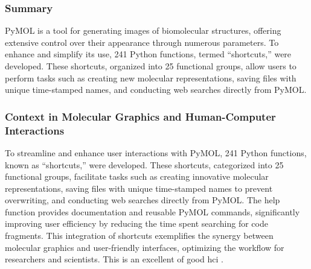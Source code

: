

\subsubsection*{Summary} 
PyMOL is a tool for generating images of biomolecular structures, offering extensive control over their appearance through numerous parameters. 
To enhance and simplify its use, 241 Python functions, termed “shortcuts,” were developed. 
These shortcuts, organized into 25 functional groups, allow users to perform tasks such as creating new molecular representations, saving files with unique time-stamped names, and conducting web searches directly from PyMOL. 

\subsubsection*{Context in Molecular Graphics and Human-Computer Interactions} 
To streamline and enhance user interactions with PyMOL, 241 Python functions, known as “shortcuts,” were developed. 
These shortcuts, categorized into 25 functional groups, facilitate tasks such as creating innovative molecular representations, saving files with unique time-stamped names to prevent overwriting, and conducting web searches directly from PyMOL. 
The help function provides documentation and reusable PyMOL commands, significantly improving user efficiency by reducing the time spent searching for code fragments.  
This integration of shortcuts exemplifies the synergy between molecular graphics and user-friendly interfaces, optimizing the workflow for researchers and scientists.
This is an excellent of good \gls{hci} .